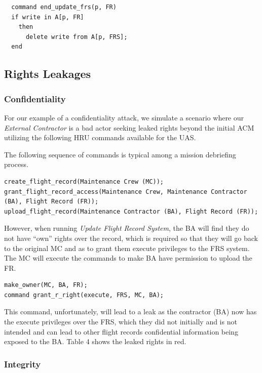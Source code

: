 \documentclass[10pt,journal,compsoc]{IEEEtran}
\begin{document}
\begin{lstlisting}
  command end_update_frs(p, FR)
  if write in A[p, FR]
    then
      delete write from A[p, FRS];
  end
\end{lstlisting}

\subsection{Rights Leakages}
  
\subsubsection{Confidentiality}

  For our example of a confidentiality attack, we simulate a scenario where our \textit{External Contractor} is a bad actor seeking leaked rights beyond the initial ACM utilizing the following HRU commands available for the UAS.

  The following sequence of commands is typical among a mission debriefing process. 

\begin{lstlisting}
create_flight_record(Maintenance Crew (MC));
grant_flight_record_access(Maintenance Crew, Maintenance Contractor (BA), Flight Record (FR));
upload_flight_record(Maintenance Contractor (BA), Flight Record (FR));
\end{lstlisting}  

  However, when running \textit{Update Flight Record System}, the BA will find they do not have ``own'' rights over the record, which is required so that they will go back to the original MC and as to grant them execute privileges to the FRS system. 
  The MC will execute the commands to make BA have permission to upload the FR. 

\begin{lstlisting}
make_owner(MC, BA, FR);
command grant_r_right(execute, FRS, MC, BA);
\end{lstlisting}

  This command, unfortunately, will lead to a leak as the contractor (BA) now has the execute privileges over the FRS, which they did not initially and is not intended and can lead to other flight records confidential information being exposed to the BA. 
  Table 4 shows the leaked rights in red. 

\subsubsection{Integrity}
\end{document}
